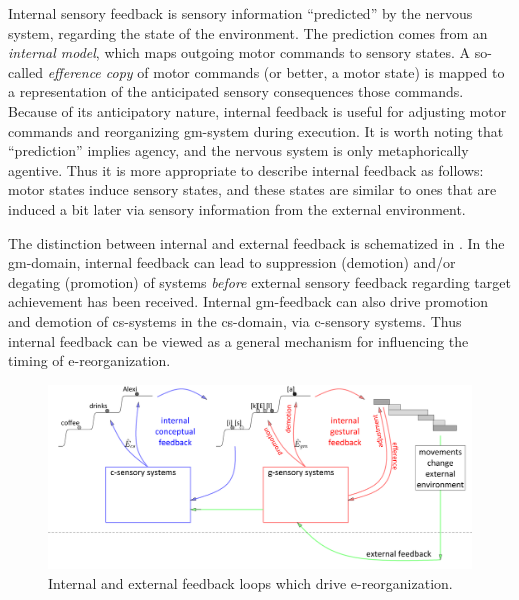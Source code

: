   Internal sensory feedback is sensory information “predicted” by the nervous system, regarding the state of the environment. The prediction comes from an \textit{internal model}, which maps outgoing motor commands to sensory states. A so-called \textit{efference copy} of motor commands (or better, a motor state) is mapped to a representation of the anticipated sensory consequences those commands. Because of its anticipatory nature, internal feedback is useful for adjusting motor commands and reorganizing gm-system during execution. It is worth noting that “prediction” implies agency, and the nervous system is only metaphorically agentive. Thus it is more appropriate to describe internal feedback as follows: motor states induce sensory states, and these states are similar to ones that are induced a bit later via sensory information from the external environment.

The distinction between internal and external feedback is schematized in {}. In the gm-domain, internal feedback can lead to suppression (demotion) and/or degating (promotion) of systems \textit{before} external sensory feedback regarding target achievement has been received. Internal gm-feedback can also drive promotion and demotion of cs-systems in the cs-domain, via c-sensory systems. Thus internal feedback can be viewed as a general mechanism for influencing the timing of e-reorganization.

  
\begin{figure}
\includegraphics[width=\textwidth]{figures/Tilsen-img57.png}
\caption{Internal and external feedback loops which drive e-reorganization.}
\label{fig:4:7}
\end{figure}
       

